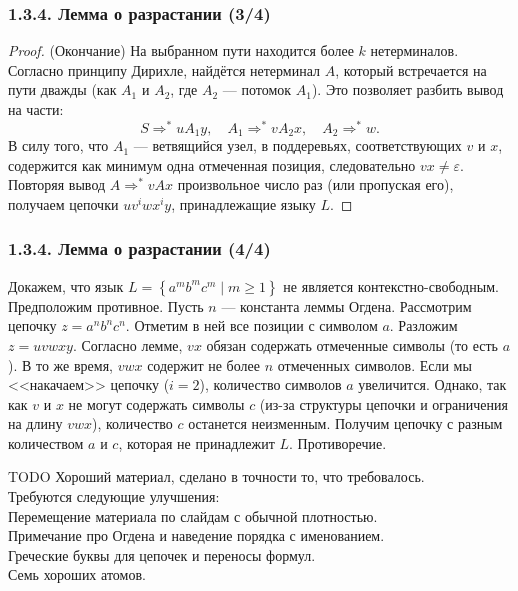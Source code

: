 \documentclass[mathserif,12pt,aspectratio=169]{beamer}
\def\Set#1#2{\left\{ #1 \mid #2 \right\}}
\let\ge\geqslant
\def\TODO#1{{\color{gray} TODO {#1}}}
\begin{document}
\begin{frame}
\frametitle{1.3.4. Лемма о разрастании (3/4)}

\begin{proof} (Окончание)
На выбранном пути находится более $k$ нетерминалов. \\Согласно принципу Дирихле, найдётся нетерминал $A$, который встречается на пути дважды (как $A_1$ и $A_2$, где $A_2$ — потомок $A_1$).
Это позволяет разбить вывод на части:
$$
S \Rightarrow^* u A_1 y, \quad A_1 \Rightarrow^* v A_2 x, \quad A_2 \Rightarrow^* w.
$$
В силу того, что $A_1$ — ветвящийся узел, в поддеревьях, соответствующих $v$ и $x$, содержится как минимум одна отмеченная позиция, следовательно $vx \neq \varepsilon$.
Повторяя вывод $A \Rightarrow^* v A x$ произвольное число раз (или пропуская его), получаем цепочки $u v^i w x^i y$, принадлежащие языку $L$.
\end{proof}
\end{frame}

\begin{frame}
\frametitle{1.3.4. Лемма о разрастании (4/4)}

\begin{example}
Докажем, что язык $L = \Set{a^m b^m c^m}{m \ge 1}$ не является контекстно-свободным.
Предположим противное. Пусть $n$ — константа леммы Огдена.
Рассмотрим цепочку $z = a^n b^n c^n$. Отметим в ней все позиции с символом $a$.
Разложим $z = u v w x y$.
Согласно лемме, $vx$ обязан содержать отмеченные символы (то есть $a$).
В то же время, $vwx$ содержит не более $n$ отмеченных символов.
Если мы <<накачаем>> цепочку ($i=2$), количество символов $a$ увеличится.
Однако, так как $v$ и $x$ не могут содержать символы $c$ (из-за структуры цепочки и ограничения на длину $vwx$), количество $c$ останется неизменным.
Получим цепочку с разным количеством $a$ и $c$, которая не принадлежит $L$.
Противоречие.
\end{example}

\bigskip
\TODO{Хороший материал, сделано в точности то, что требовалось. \\
Требуются следующие улучшения: \\
Перемещение материала по слайдам с обычной плотностью.\\
Примечание про Огдена и наведение порядка с именованием. \\
Греческие буквы для цепочек и переносы формул. \\
Семь хороших атомов.  }

\end{frame}
\end{document}
